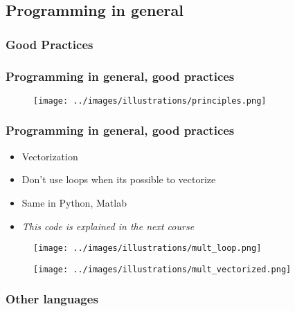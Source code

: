\subsection{Programming in general}

\subsubsection{Good Practices}

\begin{frame}\frametitle{Programming in general, good practices}
   \begin{figure}[H]
      \texttt{[image: ../images/illustrations/principles.png]}
   \end{figure}
\end{frame}

\begin{frame}\frametitle{Programming in general, good practices}
   \begin{itemize}
      \item Vectorization
      \item Don't use loops when its possible to vectorize
      \item Same in Python, Matlab
      \item \textit{This code is explained in the next course}
   \end{itemize}

   \begin{figure}[H]
      \texttt{[image: ../images/illustrations/mult\_loop.png]}
   \end{figure}

   \begin{figure}[H]
      \texttt{[image: ../images/illustrations/mult\_vectorized.png]}
   \end{figure}
\end{frame}


\subsubsection{Other languages}

